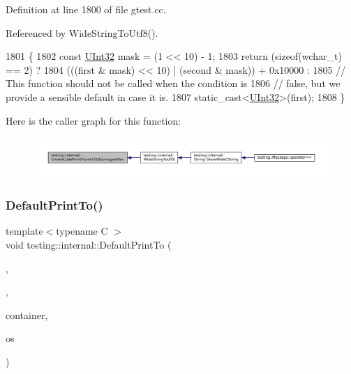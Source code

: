 Definition at line 1800 of file gtest.\+cc.



Referenced by Wide\+String\+To\+Utf8().


\begin{DoxyCode}
1801                                                                     \{
1802   \textcolor{keyword}{const} \hyperlink{namespacetesting_1_1internal_a40d4fffcd2bf56f18b1c380615aa85e3}{UInt32} mask = (1 << 10) - 1;
1803   \textcolor{keywordflow}{return} (\textcolor{keyword}{sizeof}(\textcolor{keywordtype}{wchar\_t}) == 2) ?
1804       (((first & mask) << 10) | (second & mask)) + 0x10000 :
1805       \textcolor{comment}{// This function should not be called when the condition is}
1806       \textcolor{comment}{// false, but we provide a sensible default in case it is.}
1807       \textcolor{keyword}{static\_cast<}\hyperlink{namespacetesting_1_1internal_a40d4fffcd2bf56f18b1c380615aa85e3}{UInt32}\textcolor{keyword}{>}(first);
1808 \}
\end{DoxyCode}
Here is the caller graph for this function\+:
\nopagebreak
\begin{figure}[H]
\begin{center}
\leavevmode
\includegraphics[width=350pt]{namespacetesting_1_1internal_ac8ef1bb10cd9e69de939789b759e6bc9_icgraph}
\end{center}
\end{figure}
\mbox{\label{namespacetesting_1_1internal_ac7dfe02c4c1cbfe89c23a93d873079c5}} 
\subsubsection{\texorpdfstring{Default\+Print\+To()}{DefaultPrintTo()}\hspace{0.1cm}{\footnotesize\ttfamily [1/3]}}
{\footnotesize\ttfamily template$<$typename C $>$ \\
void testing\+::internal\+::\+Default\+Print\+To (\begin{DoxyParamCaption}\item[{\hyperlink{namespacetesting_1_1internal_ad8f0c2883245f1df2a53618a49f0deb3}{Is\+Container}}]{,  }\item[{\hyperlink{namespacetesting_1_1internal_abb1d0789f19bdde21affccbd1078b525}{false\+\_\+type}}]{,  }\item[{const C \&}]{container,  }\item[{\+::std\+::ostream $\ast$}]{os }\end{DoxyParamCaption})}




